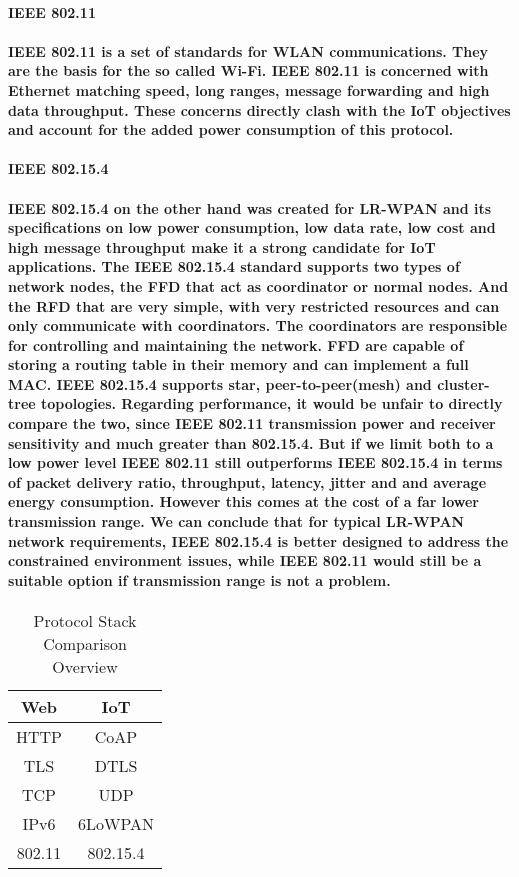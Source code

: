 \paragraph{\textbf{IEEE 802.11}}
\paragraph{
	IEEE 802.11 is a set of standards for \ac{WLAN} communications. They are the basis for the so called Wi-Fi. IEEE 802.11 is concerned with Ethernet matching speed, long ranges, message forwarding and high data throughput. These concerns directly clash with the \ac{IoT} objectives and account for the added power consumption of this protocol.
}

\paragraph{\textbf{IEEE 802.15.4}}
\paragraph{
	IEEE 802.15.4 on the other hand was created for \ac{LR-WPAN} and its specifications on low power consumption, low data rate, low cost and high message throughput make it a strong candidate for \ac{IoT} applications.
	The IEEE 802.15.4 standard supports two types of network nodes, the \ac{FFD} that act as coordinator or normal nodes. And the \ac{RFD} that are very simple, with very restricted resources and can only communicate with coordinators. The coordinators are responsible for controlling and maintaining the network. \ac{FFD} are capable of storing a routing table in their memory and can implement a full \ac{MAC}.
	IEEE 802.15.4 supports star, peer-to-peer(mesh) and cluster-tree topologies.
	Regarding performance, it would be unfair to directly compare the two, since IEEE 802.11 transmission power and receiver sensitivity and much greater than 802.15.4. But if we limit both to a low power level IEEE 802.11 still outperforms IEEE 802.15.4 in terms of packet delivery ratio, throughput, latency, jitter and and average energy consumption. However this comes at the cost of a far lower transmission range. \cite{Transmission2011}
	We can conclude that for typical \ac{LR-WPAN} network requirements, IEEE 802.15.4 is better designed to address the constrained environment issues, while IEEE 802.11 would still be a suitable option if transmission range is not a problem.
}

\begin{table}[h]
	\centering
	\begin{center} \caption{Protocol Stack Comparison Overview } \end{center}
	\label{tab:stack}
	\begin{tabular}{c|c}
		Web & IoT \\
		\hline
		\ac{HTTP} & \ac{CoAP} \\
		\ac{TLS} & \ac{DTLS} \\
		\ac{TCP} & \ac{UDP} \\
		IPv6 & 6LoWPAN \\
		802.11 & 802.15.4
	\end{tabular}
\end{table}

